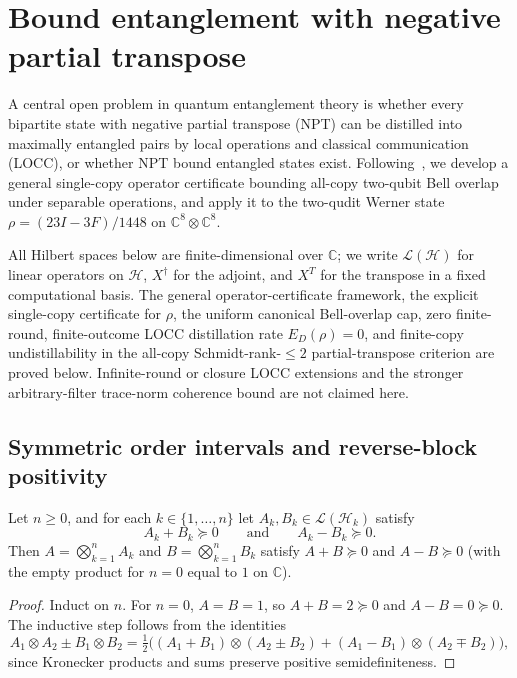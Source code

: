 \chapter{Bound entanglement with negative partial transpose}

A central open problem in quantum entanglement theory is whether every bipartite state with negative partial transpose (NPT) can be distilled into maximally entangled pairs by local operations and classical communication (LOCC), or whether NPT bound entangled states exist. Following~\cite{Faisal2026}, we develop a general single-copy operator certificate bounding all-copy two-qubit Bell overlap under separable operations, and apply it to the two-qudit Werner state $\rho = (23I - 3F)/1448$ on $\mathbb{C}^8\otimes\mathbb{C}^8$.

All Hilbert spaces below are finite-dimensional over $\mathbb{C}$; we write $\mathcal{L}(\mathcal{H})$ for linear operators on $\mathcal{H}$, $X^{\dagger}$ for the adjoint, and $X^T$ for the transpose in a fixed computational basis. The general operator-certificate framework, the explicit single-copy certificate for $\rho$, the uniform canonical Bell-overlap cap, zero finite-round, finite-outcome LOCC distillation rate $E_D(\rho)=0$, and finite-copy undistillability in the all-copy Schmidt-rank-$\le 2$ partial-transpose criterion are proved below. Infinite-round or closure LOCC extensions and the stronger arbitrary-filter trace-norm coherence bound are not claimed here.

\section{Symmetric order intervals and reverse-block positivity}

\begin{lemma}
\label{lem:tensor-interval}
\leanok
Let $n\ge 0$, and for each $k\in\{1,\dots,n\}$ let $A_k, B_k\in\mathcal{L}(\mathcal{H}_k)$ satisfy
\[
  A_k + B_k \succeq 0 \qquad\text{and}\qquad A_k - B_k \succeq 0.
\]
Then $A = \bigotimes_{k=1}^n A_k$ and $B = \bigotimes_{k=1}^n B_k$ satisfy $A + B \succeq 0$ and $A - B \succeq 0$ (with the empty product for $n=0$ equal to $1$ on $\mathbb{C}$).
\end{lemma}
\begin{proof}
\leanok
Induct on $n$. For $n=0$, $A=B=1$, so $A+B=2\succeq 0$ and $A-B=0\succeq 0$. The inductive step follows from the identities
\[
  A_1\otimes A_2 \pm B_1\otimes B_2
  = \tfrac{1}{2}\big((A_1+B_1)\otimes(A_2\pm B_2) + (A_1-B_1)\otimes(A_2\mp B_2)\big),
\]
since Kronecker products and sums preserve positive semidefiniteness.
\end{proof}

